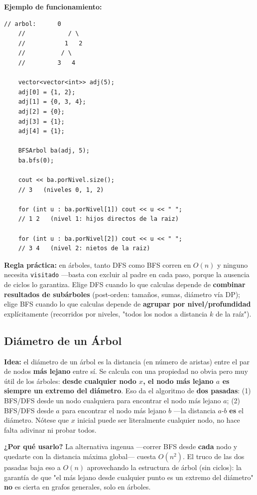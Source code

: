 \documentclass[10pt,a4paper,twocolumn]{article}
\begin{document}
\textbf{Ejemplo de funcionamiento:}

\begin{lstlisting}[style=cpp]
	// arbol:      0
	//            / \
	//           1   2
	//          / \
	//         3   4
	
	vector<vector<int>> adj(5);
	adj[0] = {1, 2};
	adj[1] = {0, 3, 4};
	adj[2] = {0};
	adj[3] = {1};
	adj[4] = {1};
	
	BFSArbol ba(adj, 5);
	ba.bfs(0);
	
	cout << ba.porNivel.size();
	// 3   (niveles 0, 1, 2)
	
	for (int u : ba.porNivel[1]) cout << u << " ";
	// 1 2   (nivel 1: hijos directos de la raiz)
	
	for (int u : ba.porNivel[2]) cout << u << " ";
	// 3 4   (nivel 2: nietos de la raiz)
\end{lstlisting}

\textbf{Regla práctica:} en árboles, tanto DFS como BFS corren en
$O(n)$ y ninguno necesita \texttt{visitado} —basta con excluir al
padre en cada paso, porque la ausencia de ciclos lo garantiza. Elige
DFS cuando lo que calculas depende de \textbf{combinar resultados de
	subárboles} (post-orden: tamaños, sumas, diámetro vía DP); elige BFS
cuando lo que calculas depende de \textbf{agrupar por
	nivel/profundidad} explícitamente (recorridos por niveles, "todos
los nodos a distancia $k$ de la raíz").

\subsection{Diámetro de un Árbol}

\textbf{Idea:} el diámetro de un árbol es la distancia (en número de
aristas) entre el par de nodos \textbf{más lejano} entre sí. Se
calcula con una propiedad no obvia pero muy útil de los árboles:
\textbf{desde cualquier nodo $x$, el nodo más lejano $a$ es siempre
	un extremo del diámetro}. Eso da el algoritmo de \textbf{dos
	pasadas}: (1) BFS/DFS desde un nodo cualquiera para encontrar el nodo
más lejano $a$; (2) BFS/DFS desde $a$ para encontrar el nodo más
lejano $b$ —la distancia $a$-$b$ \textbf{es} el diámetro. Nótese que
$x$ inicial puede ser literalmente cualquier nodo, no hace falta
adivinar ni probar todos.

\textbf{¿Por qué usarlo?} La alternativa ingenua —correr BFS desde
\textbf{cada} nodo y quedarte con la distancia máxima global— cuesta
$O(n^2)$. El truco de las dos pasadas baja eso a $O(n)$ aprovechando
la estructura de árbol (sin ciclos): la garantía de que "el más
lejano desde cualquier punto es un extremo del diámetro" \textbf{no}
es cierta en grafos generales, solo en árboles.
\end{document}
